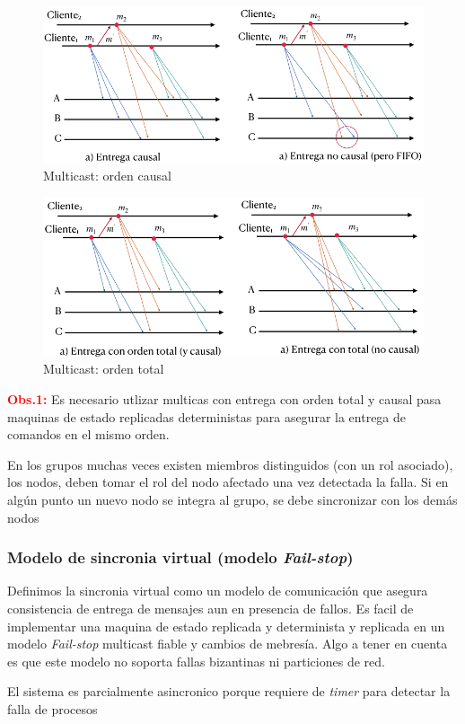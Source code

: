 \begin{figure}[H]
    \centering
    \includegraphics[width=0.7\linewidth]{img/multi_causal.png}
    \caption{Multicast: orden causal}\label{fig:1761678585653}
\end{figure}

\begin{figure}[H]
    \centering
    \includegraphics[width=0.7\linewidth]{img/multi_total.png}
    \caption{Multicast: orden total}\label{fig:1761678629682}
\end{figure}

\textcolor{red}{\textbf{Obs.1:}} Es necesario utlizar multicas con entrega con orden total y causal pasa maquinas de estado replicadas deterministas para asegurar la entrega de comandos en el mismo orden.

En los grupos muchas veces existen miembros distinguidos (con un rol asociado), los nodos, deben tomar el rol del nodo afectado una vez detectada la falla. Si en algún punto un nuevo nodo se integra al grupo, se debe sincronizar con los demás nodos
\subsubsection{Modelo de sincronia virtual (modelo \textit{Fail-stop})}
Definimos la sincronia virtual como un modelo de comunicación que asegura consistencia de entrega de mensajes aun en presencia de fallos. Es facil de implementar una maquina de estado replicada y determinista y replicada  en un modelo \textit{Fail-stop} multicast fiable y cambios de mebresía. Algo a tener en cuenta es que este modelo no soporta fallas bizantinas ni particiones de red.

El sistema es parcialmente asincronico porque requiere de \textit{timer} para detectar la falla de procesos 

